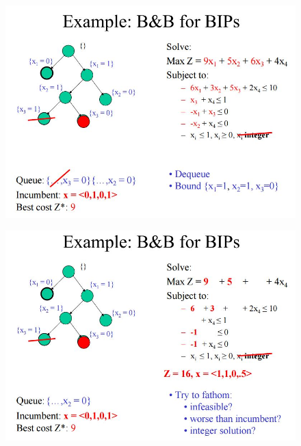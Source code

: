 \documentclass{beamer}
\begin{document}
\begin{frame}
	\begin{figure}
		\centering
		\includegraphics[width=1.0\linewidth]{BB-BIP/BB-BIP21}
	\end{figure}
\end{frame}
\begin{frame}
	\begin{figure}
		\centering
		\includegraphics[width=1.0\linewidth]{BB-BIP/BB-BIP22}
	\end{figure}
\end{frame}
\end{document}
